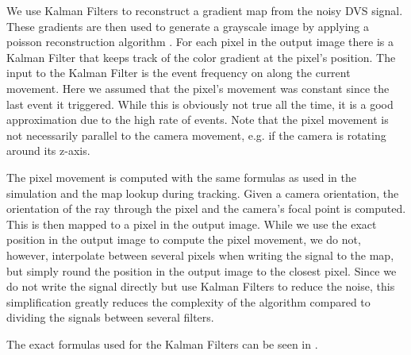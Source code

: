 We use Kalman Filters to reconstruct a gradient map from the noisy DVS signal.
These gradients are then used to generate a grayscale image by applying a
poisson reconstruction algorithm \cite{raskarpoisson}. For each pixel in the
output image there is a Kalman Filter that keeps track of the color gradient at
the pixel's position. The input to the Kalman Filter is the event frequency on
along the current movement. Here we assumed that the pixel's
movement was constant since the last event it triggered. While this is
obviously not true all the time, it is a good approximation due to the high
rate of events. Note that the pixel movement is not necessarily parallel to the
camera movement, e.g. if the camera is rotating around its z-axis.

The pixel movement is computed with the same formulas as used in the
simulation and the map lookup during tracking. Given a camera orientation, the
orientation of the ray through the pixel and the camera's focal point is
computed. This is then mapped to a pixel in the output image. While we use the
exact position in the output image to compute the pixel movement,  we do not,
however, interpolate between several pixels when writing the signal to the map,
but simply round the position in the output image to the closest pixel. Since
we do not write the signal directly but use Kalman Filters to reduce the noise,
this simplification greatly reduces the complexity of the algorithm compared to
dividing the signals between several filters.

The exact formulas used for the Kalman Filters can be seen in
\cite{kim2014simultaneous}.
